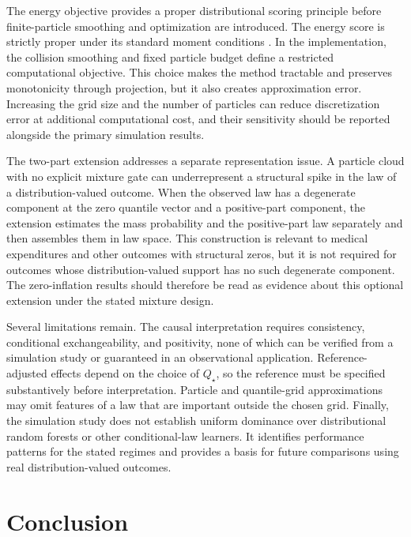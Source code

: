 The energy objective provides a proper distributional scoring principle before finite-particle smoothing and optimization are introduced. The energy score is strictly proper under its standard moment conditions \citep{gneiting2007proper}. In the implementation, the collision smoothing and fixed particle budget define a restricted computational objective. This choice makes the method tractable and preserves monotonicity through projection, but it also creates approximation error. Increasing the grid size and the number of particles can reduce discretization error at additional computational cost, and their sensitivity should be reported alongside the primary simulation results.

The two-part extension addresses a separate representation issue. A particle cloud with no explicit mixture gate can underrepresent a structural spike in the law of a distribution-valued outcome. When the observed law has a degenerate component at the zero quantile vector and a positive-part component, the extension estimates the mass probability and the positive-part law separately and then assembles them in law space. This construction is relevant to medical expenditures and other outcomes with structural zeros, but it is not required for outcomes whose distribution-valued support has no such degenerate component. The zero-inflation results should therefore be read as evidence about this optional extension under the stated mixture design.

Several limitations remain. The causal interpretation requires consistency, conditional exchangeability, and positivity, none of which can be verified from a simulation study or guaranteed in an observational application. Reference-adjusted effects depend on the choice of $Q_\star$, so the reference must be specified substantively before interpretation. Particle and quantile-grid approximations may omit features of a law that are important outside the chosen grid. Finally, the simulation study does not establish uniform dominance over distributional random forests or other conditional-law learners. It identifies performance patterns for the stated regimes and provides a basis for future comparisons using real distribution-valued outcomes.

\section{Conclusion}

